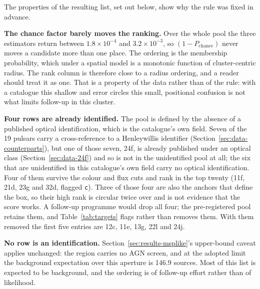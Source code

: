 \documentclass[11pt]{article}
\newcommand{\pchance}{\ensuremath{P_{\mathrm{chance}}}}
\begin{document}
The properties of the resulting list, set out below, show why the rule was fixed
in advance.

\textbf{The chance factor barely moves the ranking.} Over the whole pool the three estimators
return between $1.8\times10^{-4}$ and $3.2\times10^{-3}$, so $(1-\pchance{})$ never
moves a candidate more than one place. The ordering is the membership probability,
which under a spatial model is a monotonic function of cluster-centric radius. The
rank column is therefore close to a radius ordering, and a reader should treat it
as one. That is a property of the data rather than of the rule: with a catalogue
this shallow and error circles this small, positional confusion is not what limits
follow-up in this cluster.

\textbf{Four rows are already identified.} The pool is defined by the absence of a
published optical identification, which is the catalogue's own field. Seven of the
19 pulsars carry a cross-reference to a Henleywillis identifier (Section~\ref{sec:data-counterparts}), but one of those seven, 24f, is already published under an
optical class (Section~\ref{sec:data-24f}) and so is not in the unidentified pool
at all; the six that are unidentified in this catalogue's own field carry no
optical identification. Four
of them survive the colour and flux cuts and rank in the top twenty (11f, 21d, 23g
and 32d, flagged \texttt{c}). Three of those four are also the anchors that define
the box, so their high rank is circular twice over and is not evidence that the
score works. A follow-up programme would drop all four; the pre-registered pool
retains them, and Table~\ref{tab:targets} flags rather than removes them. With them
removed the first five entries are 12c, 11e, 13g, 22l and 24j.

\textbf{No row is an identification.} Section~\ref{sec:results-msplike}'s
upper-bound caveat applies unchanged: the region carries no AGN screen, and at the
adopted limit the background expectation over this aperture is 146.9 sources. Most
of this list is expected to be background, and the ordering is of follow-up effort
rather than of likelihood.
\end{document}
